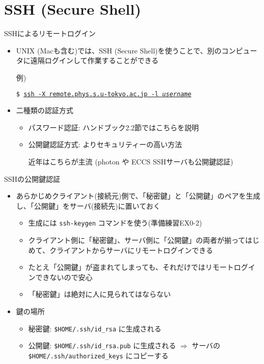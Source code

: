 \documentclass[dvipdfmx]{beamer}
\begin{document}
\section{SSH (Secure Shell)}

\begin{frame}[t,fragile]{SSHによるリモートログイン}
  \begin{itemize}
    \setlength{\itemsep}{1em}
  \item UNIX (Macも含む)では、SSH (Secure Shell)を使うことで、別のコンピュータに遠隔ログインして作業することができる

    例)
    
    {\tt \$ \underline{ssh -X remote.phys.s.u-tokyo.ac.jp -l {\it username}}}
  \item 二種類の認証方式
    \begin{itemize}
    \item パスワード認証: ハンドブック2.2節ではこちらを説明
    \item 公開鍵認証方式: よりセキュリティーの高い方法

      近年はこちらが主流 (photon や ECCS SSHサーバも公開鍵認証)
    \end{itemize}
  \end{itemize}
\end{frame}

\begin{frame}[t,fragile]{SSHの公開鍵認証}
  \begin{itemize}
    \setlength{\itemsep}{1em}
  \item あらかじめクライアント(接続元)側で、「秘密鍵」と「公開鍵」のペアを生成し、「公開鍵」をサーバ(接続先)に置いておく
    \begin{itemize}
    \item 生成には {\tt ssh-keygen} コマンドを使う(準備練習EX0-2)
    \item クライアント側に「秘密鍵」、サーバ側に「公開鍵」の両者が揃ってはじめて、クライアントからサーバにリモートログインできる
    \item たとえ「公開鍵」が盗まれてしまっても、それだけではリモートログインできないので安心
    \item 「秘密鍵」は絶対に人に見られてはならない
    \end{itemize}
  \item 鍵の場所
    \begin{itemize}
    \item 秘密鍵: {\tt \$HOME/.ssh/id\_rsa} に生成される
    \item 公開鍵: {\tt \$HOME/.ssh/id\_rsa.pub} に生成される $\Rightarrow$
      サーバの {\tt \$HOME/.ssh/authorized\_keys} にコピーする
    \end{itemize}
  \end{itemize}
\end{frame}
\end{document}
